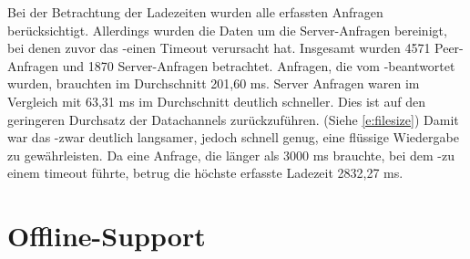 Bei der Betrachtung der Ladezeiten wurden alle erfassten Anfragen berücksichtigt. Allerdings wurden die Daten um die Server-Anfragen bereinigt, bei denen zuvor das \pTp-\cdn einen Timeout verursacht hat. Insgesamt wurden 4571 Peer-Anfragen und 1870 Server-Anfragen betrachtet. 
Anfragen, die vom \pTp-\cdn beantwortet wurden, brauchten im Durchschnitt 201,60 ms. Server Anfragen waren im Vergleich mit 63,31 ms im Durchschnitt deutlich schneller. Dies ist auf den geringeren Durchsatz der \webrtc Datachannels zurückzuführen. (Siehe \ref{e:filesize}) Damit war das \pTp-\cdn zwar deutlich langsamer, jedoch schnell genug, eine flüssige Wiedergabe zu gewährleisten. Da eine Anfrage, die länger als 3000 ms brauchte, bei dem \pTp-\cdn zu einem timeout führte, betrug die höchste erfasste Ladezeit 2832,27 ms.    


\section{Offline-Support} \label{e:offline}

